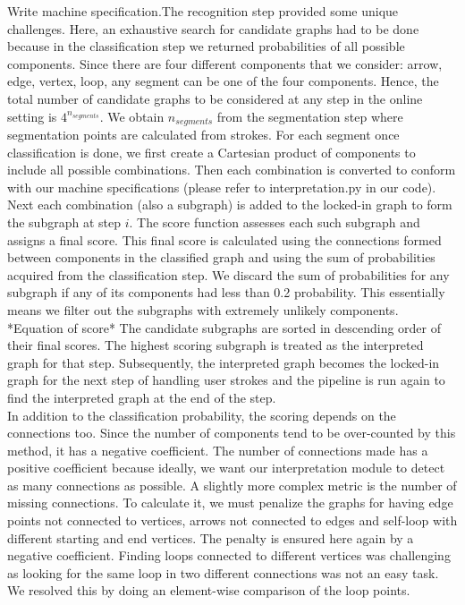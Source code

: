 Write machine specification.The recognition step provided some unique challenges. Here, an exhaustive search for candidate graphs had to be done because in the classification step we returned probabilities of all possible components. Since there are four different components that we consider: arrow, edge, vertex, loop, any segment can be one of the four components. Hence, the total number of candidate graphs to be considered at any step in the online setting is $4^{n_{segments}}$. We obtain $n_{segments}$ from the segmentation step where segmentation points are calculated from strokes. For each segment once classification is done, we first create a Cartesian product of components to include all possible combinations. Then each combination is converted to conform with our machine specifications (please refer to interpretation.py in our code). Next each combination (also a subgraph) is added to the locked-in graph to form the subgraph at step $i$. The score function assesses each such subgraph and assigns a final score. This final score is calculated using the connections formed between components in the classified graph and using the sum of probabilities acquired from the classification step. We discard the sum of probabilities for any subgraph if any of its components had less than 0.2 probability. This essentially means we filter out the subgraphs with extremely unlikely components. *Equation of score* The candidate subgraphs are sorted in descending order of their final scores. The highest scoring subgraph is treated as the interpreted graph for that step. Subsequently, the interpreted graph becomes the locked-in graph for the next step of handling user strokes and the pipeline is run again to find the interpreted graph at the end of the step.\\

In addition to the classification probability, the scoring depends on the connections too. Since the number of components tend to be over-counted by this method, it has a negative coefficient. The number of connections made has a positive coefficient because ideally, we want our interpretation module to detect as many connections as possible. A slightly more complex metric is the number of missing connections. To calculate it, we must penalize the graphs for having edge points not connected to vertices, arrows not connected to edges and self-loop with different starting and end vertices. The penalty is ensured here again by a negative coefficient. Finding loops connected to different vertices was challenging as looking for the same loop in two different connections was not an easy task. We resolved this by doing an element-wise comparison of the loop points.

